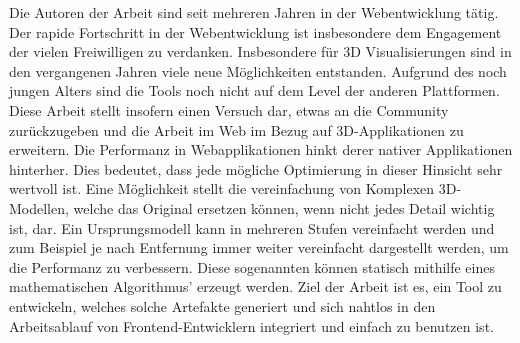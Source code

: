Die Autoren der Arbeit sind seit mehreren Jahren in der Webentwicklung tätig. Der rapide Fortschritt in der Webentwicklung ist insbesondere dem Engagement der vielen Freiwilligen zu verdanken.
Insbesondere für 3D Visualisierungen sind in den vergangenen Jahren viele neue Möglichkeiten entstanden. Aufgrund des noch jungen Alters sind die Tools noch nicht auf dem Level der anderen Plattformen. Diese Arbeit stellt insofern einen Versuch dar, etwas an die Community zurückzugeben und die Arbeit im Web im Bezug auf 3D-Applikationen zu erweitern.
Die Performanz in Webapplikationen hinkt derer nativer Applikationen hinterher. Dies bedeutet, dass jede mögliche Optimierung in dieser Hinsicht sehr wertvoll ist.
Eine Möglichkeit stellt die vereinfachung von Komplexen 3D-Modellen, welche das Original ersetzen können, wenn nicht jedes Detail wichtig ist, dar.
Ein Ursprungsmodell kann in mehreren Stufen vereinfacht werden und zum Beispiel je nach Entfernung immer weiter vereinfacht dargestellt werden, um die Performanz zu verbessern.
Diese sogenannten  können statisch mithilfe eines mathematischen Algorithmus' erzeugt werden. Ziel der Arbeit ist es, ein Tool zu entwickeln, welches solche Artefakte generiert und sich nahtlos in den Arbeitsablauf von Frontend-Entwicklern integriert und einfach zu benutzen ist.